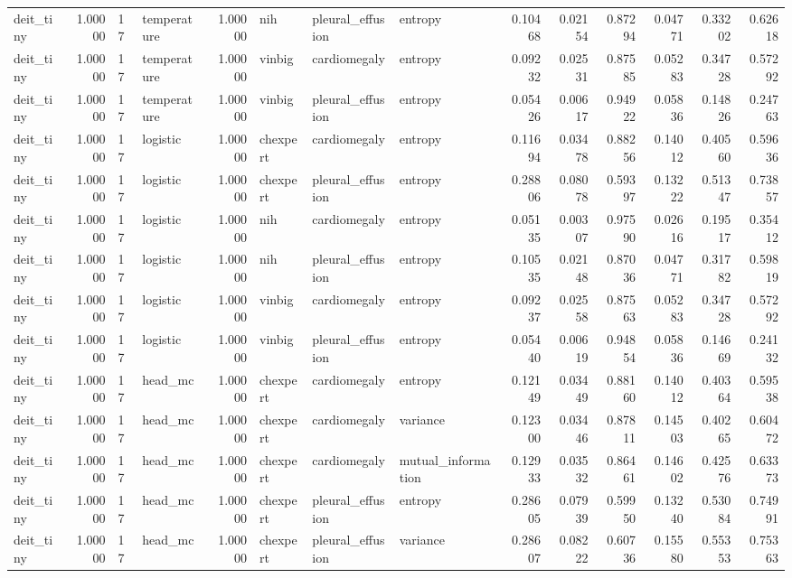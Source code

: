 \begin{tabular}{lrllrlllrrrrrr}
deit\_tiny & 1.00000 & 17 & temperature & 1.00000 & nih & pleural\_effusion & entropy & 0.10468 & 0.02154 & 0.87294 & 0.04771 & 0.33202 & 0.62618 \\
deit\_tiny & 1.00000 & 17 & temperature & 1.00000 & vinbig & cardiomegaly & entropy & 0.09232 & 0.02531 & 0.87585 & 0.05283 & 0.34728 & 0.57292 \\
deit\_tiny & 1.00000 & 17 & temperature & 1.00000 & vinbig & pleural\_effusion & entropy & 0.05426 & 0.00617 & 0.94922 & 0.05836 & 0.14826 & 0.24763 \\
deit\_tiny & 1.00000 & 17 & logistic & 1.00000 & chexpert & cardiomegaly & entropy & 0.11694 & 0.03478 & 0.88256 & 0.14012 & 0.40560 & 0.59636 \\
deit\_tiny & 1.00000 & 17 & logistic & 1.00000 & chexpert & pleural\_effusion & entropy & 0.28806 & 0.08078 & 0.59397 & 0.13222 & 0.51347 & 0.73857 \\
deit\_tiny & 1.00000 & 17 & logistic & 1.00000 & nih & cardiomegaly & entropy & 0.05135 & 0.00307 & 0.97590 & 0.02616 & 0.19517 & 0.35412 \\
deit\_tiny & 1.00000 & 17 & logistic & 1.00000 & nih & pleural\_effusion & entropy & 0.10535 & 0.02148 & 0.87036 & 0.04771 & 0.31782 & 0.59819 \\
deit\_tiny & 1.00000 & 17 & logistic & 1.00000 & vinbig & cardiomegaly & entropy & 0.09237 & 0.02558 & 0.87563 & 0.05283 & 0.34728 & 0.57292 \\
deit\_tiny & 1.00000 & 17 & logistic & 1.00000 & vinbig & pleural\_effusion & entropy & 0.05440 & 0.00619 & 0.94854 & 0.05836 & 0.14669 & 0.24132 \\
deit\_tiny & 1.00000 & 17 & head\_mc & 1.00000 & chexpert & cardiomegaly & entropy & 0.12149 & 0.03449 & 0.88160 & 0.14012 & 0.40364 & 0.59538 \\
deit\_tiny & 1.00000 & 17 & head\_mc & 1.00000 & chexpert & cardiomegaly & variance & 0.12300 & 0.03446 & 0.87811 & 0.14503 & 0.40265 & 0.60472 \\
deit\_tiny & 1.00000 & 17 & head\_mc & 1.00000 & chexpert & cardiomegaly & mutual\_information & 0.12933 & 0.03532 & 0.86461 & 0.14602 & 0.42576 & 0.63373 \\
deit\_tiny & 1.00000 & 17 & head\_mc & 1.00000 & chexpert & pleural\_effusion & entropy & 0.28605 & 0.07939 & 0.59950 & 0.13240 & 0.53084 & 0.74991 \\
deit\_tiny & 1.00000 & 17 & head\_mc & 1.00000 & chexpert & pleural\_effusion & variance & 0.28607 & 0.08222 & 0.60736 & 0.15580 & 0.55353 & 0.75363 \\

\end{tabular}
